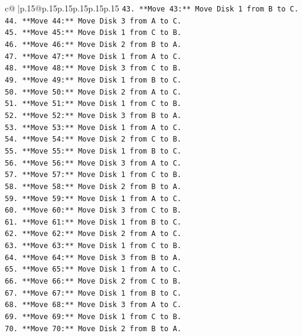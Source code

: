 \documentclass{article}
\begin{document}
{\begin{supertabular}{c@{$\;$}|p{.15\linewidth}@{}p{.15\linewidth}p{.15\linewidth}p{.15\linewidth}p{.15\linewidth}p{.15\linewidth}}
{{{\texttt{43. **Move 43:** Move Disk 1 from B to C.} \\
\texttt{44. **Move 44:** Move Disk 3 from A to C.} \\
\texttt{45. **Move 45:** Move Disk 1 from C to B.} \\
\texttt{46. **Move 46:** Move Disk 2 from B to A.} \\
\texttt{47. **Move 47:** Move Disk 1 from A to C.} \\
\texttt{48. **Move 48:** Move Disk 3 from C to B.} \\
\texttt{49. **Move 49:** Move Disk 1 from B to C.} \\
\texttt{50. **Move 50:** Move Disk 2 from A to C.} \\
\texttt{51. **Move 51:** Move Disk 1 from C to B.} \\
\texttt{52. **Move 52:** Move Disk 3 from B to A.} \\
\texttt{53. **Move 53:** Move Disk 1 from A to C.} \\
\texttt{54. **Move 54:** Move Disk 2 from C to B.} \\
\texttt{55. **Move 55:** Move Disk 1 from B to C.} \\
\texttt{56. **Move 56:** Move Disk 3 from A to C.} \\
\texttt{57. **Move 57:** Move Disk 1 from C to B.} \\
\texttt{58. **Move 58:** Move Disk 2 from B to A.} \\
\texttt{59. **Move 59:** Move Disk 1 from A to C.} \\
\texttt{60. **Move 60:** Move Disk 3 from C to B.} \\
\texttt{61. **Move 61:** Move Disk 1 from B to C.} \\
\texttt{62. **Move 62:** Move Disk 2 from A to C.} \\
\texttt{63. **Move 63:** Move Disk 1 from C to B.} \\
\texttt{64. **Move 64:** Move Disk 3 from B to A.} \\
\texttt{65. **Move 65:** Move Disk 1 from A to C.} \\
\texttt{66. **Move 66:** Move Disk 2 from C to B.} \\
\texttt{67. **Move 67:** Move Disk 1 from B to C.} \\
\texttt{68. **Move 68:** Move Disk 3 from A to C.} \\
\texttt{69. **Move 69:** Move Disk 1 from C to B.} \\
\texttt{70. **Move 70:** Move Disk 2 from B to A.} \\
}}}
\end{supertabular}}
\end{document}
